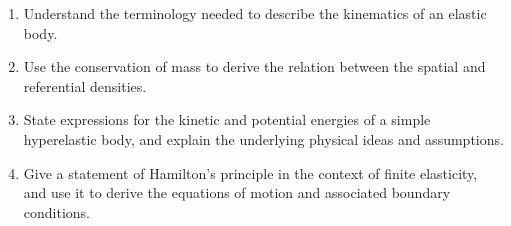 \documentclass[14pt]{beamer}
\begin{document}
\begin{frame}[t]
\begin{enumerate}
\item[(i)] Understand the terminology needed to describe the kinematics of an elastic body.
\item[(ii)] Use the conservation of mass to derive the relation between the spatial and referential densities.
\item[(iii)] State expressions for the kinetic and potential energies of a simple hyperelastic body, and explain the
underlying physical ideas and assumptions.
\item[(iv)] Give a statement of Hamilton's principle in the context of finite elasticity, and use it to derive the
equations of motion and associated boundary conditions.
\end{enumerate}
\end{frame}
\end{document}
